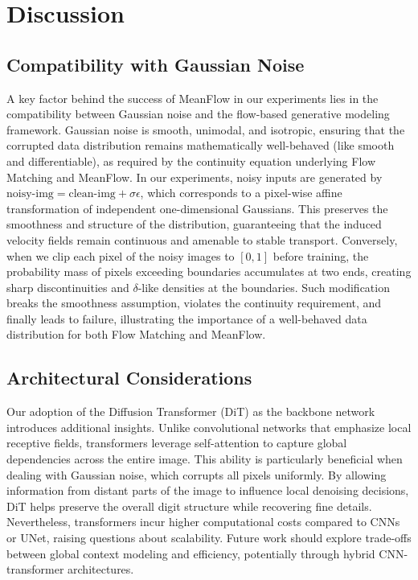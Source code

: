 \section{Discussion}

\subsection{Compatibility with Gaussian Noise}

A key factor behind the success of MeanFlow in our experiments lies in the compatibility between Gaussian noise and the flow-based generative modeling framework. Gaussian noise is smooth, unimodal, and isotropic, ensuring that the corrupted data distribution remains mathematically well-behaved (like smooth and differentiable), as required by the continuity equation underlying Flow Matching and MeanFlow. In our experiments, noisy inputs are generated by $\text{noisy-img} = \text{clean-img} + \sigma \epsilon$, which corresponds to a pixel-wise affine transformation of independent one-dimensional Gaussians. This preserves the smoothness and structure of the distribution, guaranteeing that the induced velocity fields remain continuous and amenable to stable transport. Conversely, when we clip each pixel of the noisy images to $[0, 1]$ before training, the probability mass of pixels exceeding boundaries accumulates at two ends, creating sharp discontinuities and $\delta$-like densities at the boundaries. Such modification breaks the smoothness assumption, violates the continuity requirement, and finally leads to failure, illustrating the importance of a well-behaved data distribution for both Flow Matching and MeanFlow.

\subsection{Architectural Considerations}

Our adoption of the Diffusion Transformer (DiT) as the backbone network introduces additional insights. Unlike convolutional networks that emphasize local receptive fields, transformers leverage self-attention to capture global dependencies across the entire image. This ability is particularly beneficial when dealing with Gaussian noise, which corrupts all pixels uniformly. By allowing information from distant parts of the image to influence local denoising decisions, DiT helps preserve the overall digit structure while recovering fine details. Nevertheless, transformers incur higher computational costs compared to CNNs or UNet, raising questions about scalability. Future work should explore trade-offs between global context modeling and efficiency, potentially through hybrid CNN-transformer architectures.

